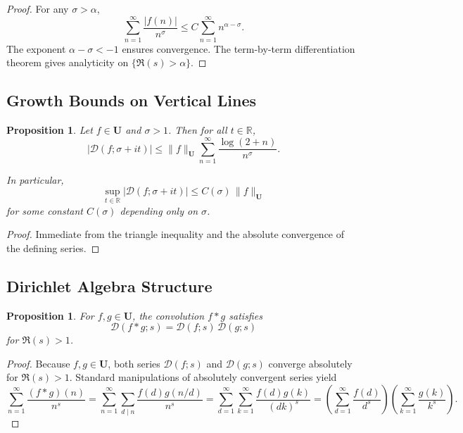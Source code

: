 \documentclass[11pt,a4paper]{article}
\theoremstyle{plain}
\newtheorem{proposition}[theorem]{Proposition}
\theoremstyle{definition}
\theoremstyle{remark}
\begin{document}
\begin{proof}
	For any $\sigma>\alpha$,
	\[
	\sum_{n=1}^{\infty} \frac{|f(n)|}{n^\sigma}
	\le C \sum_{n=1}^{\infty} n^{\alpha-\sigma}.
	\]
	The exponent $\alpha-\sigma<-1$ ensures convergence.
	The term-by-term differentiation theorem
	gives analyticity on $\{\Re(s)>\alpha\}$.
\end{proof}

\subsection{Growth Bounds on Vertical Lines}
\begin{proposition}
	Let $f\in \mathbf{U}$ and $\sigma>1$.
	Then for all $t\in\mathbb{R}$,
	\[
	|\mathcal{D}(f;\sigma+it)|
	\le \|f\|_{\mathbf{U}}
	\sum_{n=1}^{\infty}
	\frac{\log(2+n)}{n^\sigma}.
	\]

	In particular,
	\[
	\sup_{t\in\mathbb{R}}
	|\mathcal{D}(f;\sigma+it)|
	\le C(\sigma)\,\|f\|_{\mathbf{U}}
	\]
	for some constant $C(\sigma)$ depending only on $\sigma$.
\end{proposition}

\begin{proof}
	Immediate from the triangle inequality and the absolute convergence
	of the defining series.
\end{proof}

\subsection{Dirichlet Algebra Structure}
\begin{proposition}
	For $f,g\in \mathbf{U}$, the convolution $f*g$
	satisfies
	\[
	\mathcal{D}(f*g;s)
	= \mathcal{D}(f;s)\,\mathcal{D}(g;s)
	\]
	for $\Re(s)>1$.
\end{proposition}

\begin{proof}
	Because $f,g \in \mathbf{U}$, both series
	$\mathcal{D}(f;s)$ and $\mathcal{D}(g;s)$ converge absolutely
	for $\Re(s)>1$. Standard manipulations of absolutely convergent
	series yield
	\[
	\sum_{n=1}^{\infty} \frac{(f*g)(n)}{n^s}
	= \sum_{n=1}^{\infty}\sum_{d\mid n}
	\frac{f(d)g(n/d)}{n^s}
	= \sum_{d=1}^{\infty}\sum_{k=1}^{\infty}
	\frac{f(d)g(k)}{(dk)^s}
	= \left(\sum_{d=1}^{\infty}\frac{f(d)}{d^s}\right)
	\left(\sum_{k=1}^{\infty}\frac{g(k)}{k^s}\right).
	\]
\end{proof}
\end{document}
